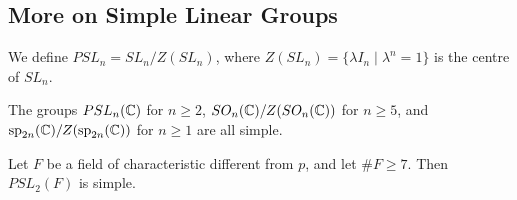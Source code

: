 \subsection{More on Simple Linear Groups}

We define $PSL_{n} = SL_{n}/Z(SL_{n})$, where $Z(SL_{n}) = \{\lambda I_{n} \mid \lambda^{n} = 1\}$ is the centre of $SL_{n}$.

\begin{theorem}
    The groups $PSL_{n}(\mathbb{C})$ for $n \geq 2$, $SO_{n}(\mathbb{C})/Z(SO_{n}(\mathbb{C}))$ for $n \geq 5$, and $\mathrm{sp}_{2n}(\mathbb{C})/Z(\mathrm{sp}_{2n}(\mathbb{C}))$ for $n \geq 1$ are all simple.
\end{theorem}

\begin{theorem}
    Let $F$ be a field of characteristic different from $p$, and let $\# F \geq 7$. Then $PSL_{2}(F)$ is simple.
\end{theorem}

